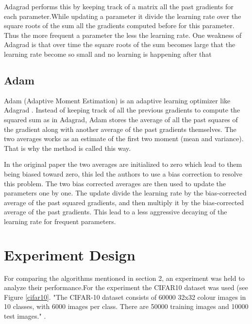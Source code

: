 \documentclass[12pt,twoside]{article}
\theoremstyle{plain}
\theoremstyle{definition}
\theoremstyle{remark}
\begin{document}
Adagrad performs this by keeping track of a matrix all the past gradients for each parameter.While updating a parameter it divide the learning rate over the square roots of the sum all the gradients computed before for this parameter. Thus the more frequent a parameter the less the learning rate. One weakness of Adagrad is that over time the square roots of the sum becomes large that the learning rate become so small and no learning is happening after that

\subsection{Adam}
Adam (Adaptive Moment Estimation) is an adaptive learning optimizer like Adagrad \cite{Kingma2015}. Instead of keeping track of all the previous gradients to compute the squared sum as in Adagrad, Adam stores the average of all the past squares of the gradient along with another average of the past gradients themselves. The two averages works as an estimate of the first two moment (mean and variance). That is why the method is called this way.

In the original paper the two averages are initialized to zero which lead to them being biased toward zero, this led the authors to use a bias correction to resolve this problem. The two bias corrected averages are then used to update the parameters one by one. The update divide the learning rate by the bias-corrected average of the past squared gradients, and then multiply it by the  bias-corrected average of the past gradients. This lead to a less aggressive decaying of the learning rate for frequent parameters.

\section{Experiment Design}
\label{sec:model}
For comparing the algorithms mentioned in section 2, an experiment was held to analyze their performance.For the experiment the CIFAR10 dataset was used (see Figure \ref{cifar10}.  "The CIFAR-10 dataset consists of 60000 32x32 colour images in 10 classes, with 6000 images per class. There are 50000 training images and 10000 test images." \cite{Krizhevsky2009}. 
\end{document}
